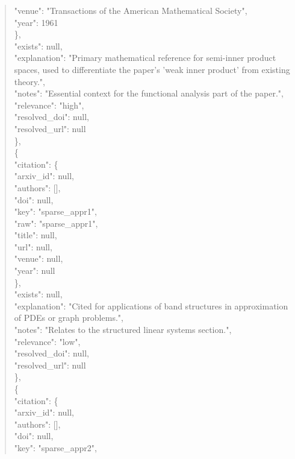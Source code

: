 \documentclass[11pt]{article}
\begin{document}
\begin{quote}
        "venue": "Transactions of the American Mathematical Society",\\
        "year": 1961\\
      \},\\
      "exists": null,\\
      "explanation": "Primary mathematical reference for semi-inner product spaces, used to differentiate the paper's 'weak inner product' from existing theory.",\\
      "notes": "Essential context for the functional analysis part of the paper.",\\
      "relevance": "high",\\
      "resolved\_doi": null,\\
      "resolved\_url": null\\
    \},\\
    \{\\
      "citation": \{\\
        "arxiv\_id": null,\\
        "authors": [],\\
        "doi": null,\\
        "key": "sparse\_appr1",\\
        "raw": "sparse\_appr1",\\
        "title": null,\\
        "url": null,\\
        "venue": null,\\
        "year": null\\
      \},\\
      "exists": null,\\
      "explanation": "Cited for applications of band structures in approximation of PDEs or graph problems.",\\
      "notes": "Relates to the structured linear systems section.",\\
      "relevance": "low",\\
      "resolved\_doi": null,\\
      "resolved\_url": null\\
    \},\\
    \{\\
      "citation": \{\\
        "arxiv\_id": null,\\
        "authors": [],\\
        "doi": null,\\
        "key": "sparse\_appr2",\\

\end{quote}
\end{document}
